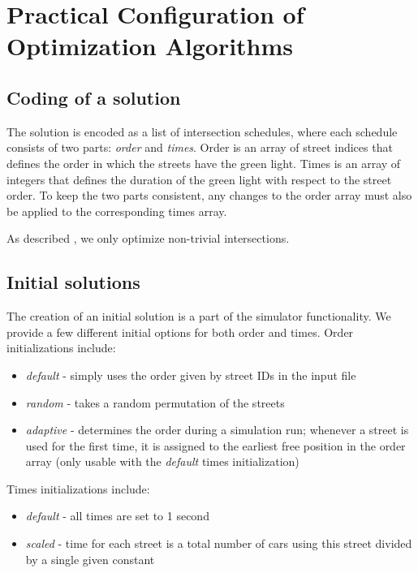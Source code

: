 \chapter{Practical Configuration of Optimization Algorithms}

\section{Coding of a solution}

The solution is encoded as a list of intersection schedules, where each schedule consists of two parts: \textit{order} and \textit{times}. Order is an array of street indices that defines the order in which the streets have the green light. Times is an array of integers that defines the duration of the green light with respect to the street order. To keep the two parts consistent, any changes to the order array must also be applied to the corresponding times array. 

As described , we only optimize non-trivial intersections.

\section{Initial solutions}

The creation of an initial solution is a part of the simulator functionality. We provide a few different initial options for both order and times. Order initializations include:

\begin{itemize}
    \item \textit{default} - simply uses the order given by street IDs in the input file
    \item \textit{random} - takes a random permutation of the streets
    \item \textit{adaptive} - determines the order during a simulation run; whenever a street is used for the first time, it is assigned to the earliest free position in the order array (only usable with the \textit{default} times initialization)
\end{itemize}

Times initializations include:

\begin{itemize}
    \item \textit{default} - all times are set to 1 second
    \item \textit{scaled} - time for each street is a total number of cars using this street divided by a single given constant
\end{itemize}


